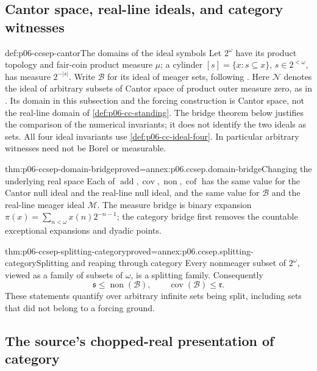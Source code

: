 \subsection{Cantor space, real-line ideals, and category witnesses}

\begin{hbconvention}{def:p06-ccsep-cantor}{The domains of the ideal symbols}
Let \(2^\omega\) have its product topology and fair-coin product measure
\(\mu\); a cylinder \([s]=\{x:s\subseteq x\}\),
\(s\in2^{<\omega}\), has measure \(2^{-|s|}\).
Write \(\mathcal B\) for its ideal of meager sets, following
\cite[\S3]{BlassReductions1994V1}.
Here \(\mathcal N\) denotes the ideal of arbitrary subsets of Cantor
space of product outer measure zero, as in
\cite[\S\S2--3]{BartoszynskiInvariants1999V1}. Its domain in this
subsection and the forcing construction is Cantor space, not the real-line
domain of \cref{def:p06-cc-standing}. The bridge theorem below justifies
the comparison of the numerical invariants; it does not identify the
two ideals as sets.
All four ideal invariants use \cref{def:p06-cc-ideal-four}.
In particular arbitrary witnesses need not be Borel or measurable.
\end{hbconvention}

\begin{hbtheorem}{thm:p06-ccsep-domain-bridge}{proved=annex:p06.ccsep.domain-bridge}{Changing the underlying real space}
Each of \(\operatorname{add},\operatorname{cov},\operatorname{non},
\operatorname{cof}\) has the same value for the Cantor null ideal
and the real-line null ideal, and the same value for \(\mathcal B\)
and the real-line meager ideal \(\mathcal M\).
The measure bridge is binary expansion
\(\pi(x)=\sum_{n<\omega}x(n)2^{-n-1}\); the category bridge first
removes the countable exceptional expansions and dyadic points.
\end{hbtheorem}

\begin{hbtheorem}{thm:p06-ccsep-splitting-category}{proved=annex:p06.ccsep.splitting-category}{Splitting and reaping through category}
Every nonmeager subset of \(2^\omega\), viewed as a family of
subsets of \(\omega\), is a splitting family. Consequently
\[
 \mathfrak s\leq\operatorname{non}(\mathcal B),\qquad
 \operatorname{cov}(\mathcal B)\leq\mathfrak r.
\]
These statements quantify over arbitrary infinite sets being split,
including sets that did not belong to a forcing ground.
\end{hbtheorem}

\subsection{The source's chopped-real presentation of category}


